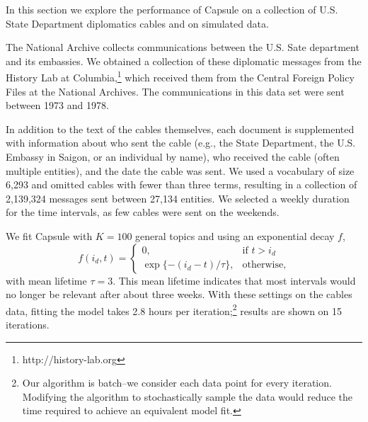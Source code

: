 




In this section we explore the performance of Capsule on a collection of U.S. State Department diplomatics cables and on simulated data.

The National Archive collects communications between the U.S. Sate department and its embassies.  We obtained a collection of these diplomatic messages from the History Lab at Columbia,\footnote{http://history-lab.org} which received them from the Central Foreign Policy Files at the National Archives.  The communications in this data set were sent between 1973 and 1978.

In addition to the text of the cables themselves, each document is supplemented with information about who sent the cable (e.g., the State Department, the U.S. Embassy in Saigon, or an individual by name), who received the cable (often multiple entities), and the date the cable was sent.  We used a vocabulary of size 6,293 and omitted cables with fewer than three terms, resulting in a collection of 2,139,324 messages sent between 27,134 entities.  We selected a weekly duration for the time intervals, as few cables were sent on the weekends.

We fit Capsule with $K=100$ general topics and using an exponential decay $f$,
\begin{equation}
f(i_d, t) = 
\begin{cases}
    0,			& \text{if } t > i_d\\
    \exp\{-(i_d - t) / \tau\},          & \text{otherwise,}
\end{cases}
\label{eq:f}
\end{equation}
with mean lifetime $\tau=3$.  This mean lifetime indicates that most intervals would no longer be relevant after about three weeks.  With these settings on the cables data, fitting the model takes 2.8 hours per iteration;\footnote{Our algorithm is batch--we consider each data point for every iteration.  Modifying the algorithm to stochastically sample the data would reduce the time required to achieve an equivalent model fit.} results are shown on 15 iterations.

